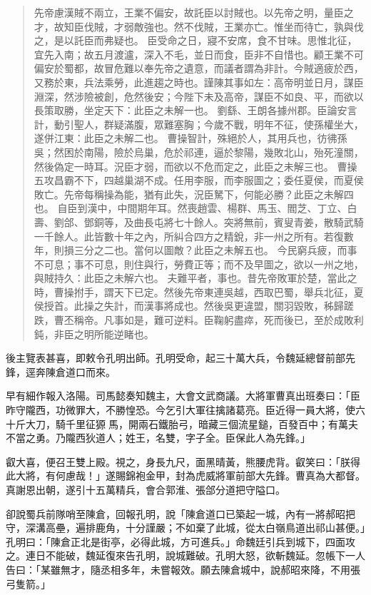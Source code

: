 \begin{quote}
先帝慮漢賊不兩立，王業不偏安，故託臣以討賊也。以先帝之明，量臣之才，故知臣伐賊，才弱敵強也。然不伐賊，王業亦亡。惟坐而待亡，孰與伐之，是以託臣而弗疑也。
臣受命之日，寢不安席，食不甘味。思惟北征，宜先入南；故五月渡瀘，深入不毛，並日而食，臣非不自惜也。顧王業不可偏安於蜀都，故冒危難以奉先帝之遺意，而議者謂為非計。今賊適疲於西，又務於東，兵法乘勞，此進趨之時也。謹陳其事如左：高帝明並日月，謀臣淵深，然涉險被創，危然後安；今陛下未及高帝，謀臣不如良、平，而欲以長策取勝，坐定天下：此臣之未解一也。
劉繇、王朗各據州郡。臣論安言計，動引聖人，群疑滿腹，眾難塞胸；今歲不戰，明年不征，使孫權坐大，遂併江東：此臣之未解二也。
曹操智計，殊絕於人，其用兵也，彷彿孫吳；然困於南陽，險於烏巢，危於祁連，逼於黎陽，幾敗北山，殆死潼關，然後偽定一時耳。況臣才弱，而欲以不危而定之，此臣之未解三也。
曹操五攻昌霸不下，四越巢湖不成。任用李服，而李服圖之；委任夏侯，而夏侯敗亡。先帝每稱操為能，猶有此失，況臣駑下，何能必勝？此臣之未解四也。
自臣到漢中，中間期年耳。然喪趙雲、楊群、馬玉、閻芝、丁立、白壽、劉郃、鄧銅等，及曲長屯將七十餘人。突將無前，賓叟青姜，散騎武騎一千餘人。此皆數十年之內，所糾合四方之精銳，非一州之所有。若復數年，則損三分之二也。當何以圖敵？此臣之未解五也。
今民窮兵疲，而事不可息；事不可息，則住與行，勞費正等；而不及早圖之，欲以一州之地，與賊持久：此臣之未解六也。
夫難平者，事也。昔先帝敗軍於楚，當此之時，曹操拊手，謂天下已定。然後先帝東連吳越，西取巴蜀，舉兵北征，夏侯授首。此操之失計，而漢事將成也。然後吳更違盟，關羽毀敗，秭歸蹉跌，曹丕稱帝。凡事如是，難可逆料。臣鞠躬盡瘁，死而後已，至於成敗利鈍，非臣之明所能逆睹也。
\end{quote}

後主覽表甚喜，即敕令孔明出師。孔明受命，起三十萬大兵，令魏延總督前部先鋒，逕奔陳倉道口而來。

早有細作報入洛陽。司馬懿奏知魏主，大會文武商議。大將軍曹真出班奏曰：「臣昨守隴西，功微罪大，不勝惶恐。今乞引大軍往擒諸葛亮。臣近得一員大將，使六十斤大刀，騎千里征獂𩣵馬，開兩石鐵胎弓，暗藏三個流星鎚，百發百中；有萬夫不當之勇。乃隴西狄道人；姓王，名雙，字子全。臣保此人為先鋒。」

叡大喜，便召王雙上殿。視之，身長九尺，面黑晴黃，熊腰虎背。叡笑曰：「朕得此大將，有何慮哉！」遂賜錦袍金甲，封為虎威將軍前部大先鋒。曹真為大都督。真謝恩出朝，遂引十五萬精兵，會合郭淮、張郃分道把守隘口。

卻說蜀兵前隊哨至陳倉，回報孔明，說「陳倉道口已築起一城，內有一將郝昭把守，深溝高壘，遍排鹿角，十分謹嚴；不如棄了此城，從太白嶺鳥道出祁山甚便。」孔明曰：「陳倉正北是街亭，必得此城，方可進兵。」命魏廷引兵到城下，四面攻之。連日不能破，魏延復來告孔明，說城難破。孔明大怒，欲斬魏延。忽帳下一人告曰：「某雖無才，隨丞相多年，未嘗報效。願去陳倉城中，說郝昭來降，不用張弓隻箭。」

